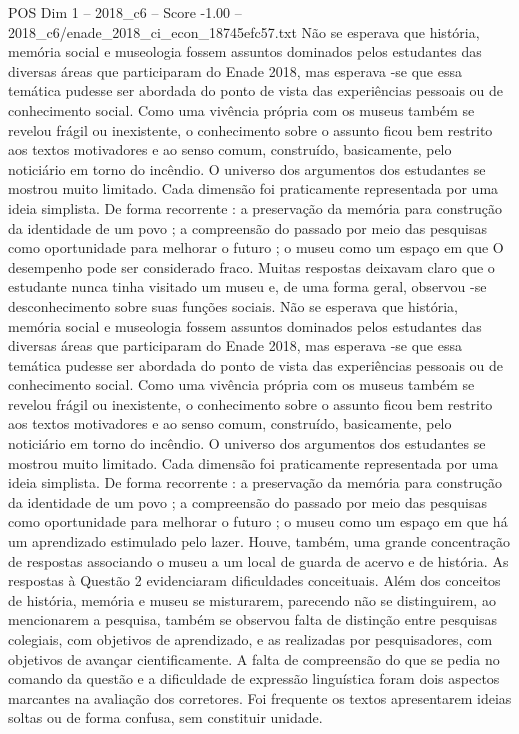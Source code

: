 \begin{textsample}{POS Dim 1 – 2018\_c6 – Score -1.00 – 2018\_c6/enade\_2018\_ci\_econ\_18745efc57.txt}
Não se esperava que história, memória social e museologia fossem assuntos dominados pelos estudantes das diversas áreas que participaram do Enade 2018, mas esperava -se que essa temática pudesse ser abordada do ponto de vista das experiências pessoais ou de conhecimento social.
Como uma vivência própria com os museus também se revelou frágil ou inexistente, o conhecimento sobre o assunto ficou bem restrito aos textos motivadores e ao senso comum, construído, basicamente, pelo noticiário em torno do incêndio.
O universo dos argumentos dos estudantes se mostrou muito limitado.
Cada dimensão foi praticamente representada por uma ideia simplista.
De forma recorrente : a preservação da memória para construção da identidade de um povo ; a compreensão do passado por meio das pesquisas como oportunidade para melhorar o futuro ; o museu como um espaço em que O desempenho pode ser considerado fraco.
Muitas respostas deixavam claro que o estudante nunca tinha visitado um museu e, de uma forma geral, observou -se desconhecimento sobre suas funções sociais.
Não se esperava que história, memória social e museologia fossem assuntos dominados pelos estudantes das diversas áreas que participaram do Enade 2018, mas esperava -se que essa temática pudesse ser abordada do ponto de vista das experiências pessoais ou de conhecimento social.
Como uma vivência própria com os museus também se revelou frágil ou inexistente, o conhecimento sobre o assunto ficou bem restrito aos textos motivadores e ao senso comum, construído, basicamente, pelo noticiário em torno do incêndio.
O universo dos argumentos dos estudantes se mostrou muito limitado.
Cada dimensão foi praticamente representada por uma ideia simplista.
De forma recorrente : a preservação da memória para construção da identidade de um povo ; a compreensão do passado por meio das pesquisas como oportunidade para melhorar o futuro ; o museu como um espaço em que há um aprendizado estimulado pelo lazer.
Houve, também, uma grande concentração de respostas associando o museu a um local de guarda de acervo e de história.
As respostas à Questão 2 evidenciaram dificuldades conceituais.
Além dos conceitos de história, memória e museu se misturarem, parecendo não se distinguirem, ao mencionarem a pesquisa, também se observou falta de distinção entre pesquisas colegiais, com objetivos de aprendizado, e as realizadas por pesquisadores, com objetivos de avançar cientificamente.
A falta de compreensão do que se pedia no comando da questão e a dificuldade de expressão linguística foram dois aspectos marcantes na avaliação dos corretores.
Foi frequente os textos apresentarem ideias soltas ou de forma confusa, sem constituir unidade.

\end{textsample}
